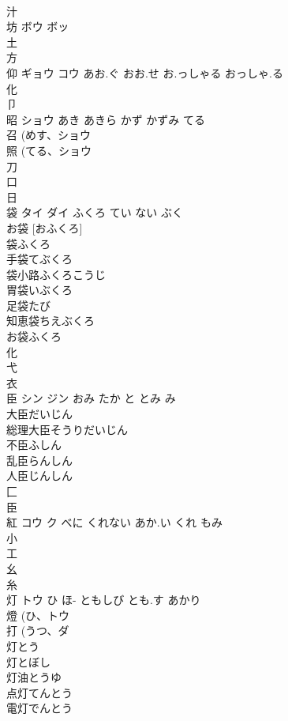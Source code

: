 \documentclass[8pt]{extreport}
\begin{document}
\begin{CJK}{UTF8}{min}
\\	汁 
\\	坊	ボウ ボッ		
\\	土 
\\	方 
\\	仰	ギョウ コウ	あお.ぐ おお.せ お.っしゃる おっしゃ.る	
\\	化 
\\	卩 
\\	昭	ショウ	あき あきら かず かずみ てる	
\\	召 (めす、ショウ 
\\	照 (てる、ショウ 
\\	刀 
\\	口 
\\	日 
\\	袋	タイ ダイ	ふくろ てい ない ぶく	
\\	お袋 [おふくろ] 
\\	袋ふくろ
\\	手袋てぶくろ
\\	袋小路ふくろこうじ
\\	胃袋いぶくろ
\\	足袋たび
\\	知恵袋ちえぶくろ
\\	お袋ふくろ
\\	化 
\\	弋 
\\	衣 
\\	臣	シン ジン	おみ たか と とみ み	
\\	大臣だいじん
\\	総理大臣そうりだいじん
\\	不臣ふしん
\\	乱臣らんしん
\\	人臣じんしん
\\	匚 
\\	臣 
\\	紅	コウ ク	べに くれない あか.い くれ もみ	
\\	小 
\\	工 
\\	幺 
\\	糸 
\\	灯	トウ	ひ ほ- ともしび とも.す あかり	
\\	燈 (ひ、トウ 
\\	打 (うつ、ダ 
\\	灯とう 
\\	灯とぼし 
\\	灯油とうゆ 
\\	点灯てんとう 
\\	電灯でんとう 

\end{CJK}
\end{document}
